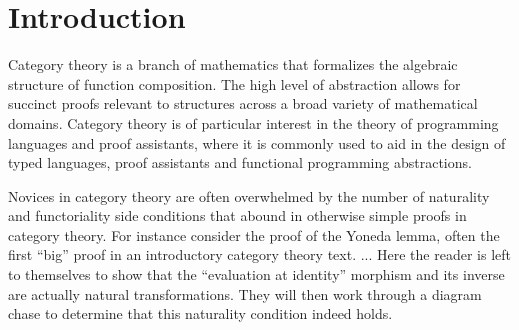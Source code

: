\documentclass[sigplan,screen]{acmart}
\begin{document}



\maketitle

\section{Introduction}
Category theory is a branch of mathematics that formalizes the
algebraic structure of function composition. The high level of
abstraction allows for succinct proofs relevant to structures across a
broad variety of mathematical domains. Category theory is of
particular interest in the theory of programming languages and proof
assistants, where it is commonly used to aid in the design of typed
languages, proof assistants and functional programming abstractions.

Novices in category theory are often overwhelmed by the number of
naturality and functoriality side conditions that abound in otherwise
simple proofs in category theory. For instance consider the proof of
the Yoneda lemma, often the first ``big'' proof in an introductory
category theory text. ... Here the reader is left to themselves to
show that the ``evaluation at identity'' morphism and its inverse are
actually natural transformations. They will then work through a
diagram chase to determine that this naturality condition indeed
holds.
\end{document}
